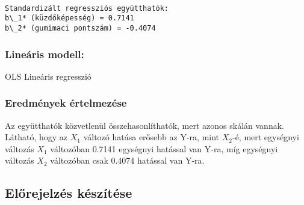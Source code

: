 \documentclass[11pt]{article}
\begin{document}
    \begin{Verbatim}[commandchars=\\\{\}]

Standardizált regressziós együtthatók:
b\_1* (küzdőképesség) = 0.7141
b\_2* (gumimaci pontszám) = -0.4074
    \end{Verbatim}

    \subsubsection{Lineáris modell:}\label{lineuxe1ris-modell}

OLS Lineáris regresszió

\subsubsection{Eredmények
értelmezése}\label{eredmuxe9nyek-uxe9rtelmezuxe9se}

Az együtthatók közvetlenül összehasonlíthatók, mert azonos skálán
vannak.\\
Látható, hogy az $X_1$ változó hatása erősebb az Y-ra, mint $X_2$-é, mert
egységnyi változás $X_1$ változóban 0.7141 egységnyi hatással van Y-ra, míg
egységnyi változás $X_2$ változóban csak 0.4074 hatással van Y-ra.

    \subsection{Előrejelzés
készítése}\label{elux151rejelzuxe9s-kuxe9szuxedtuxe9se}
\end{document}
